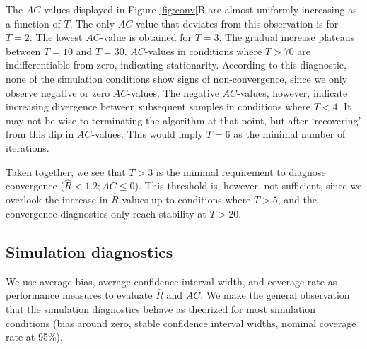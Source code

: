 \documentclass[article]{jss}
\begin{document}
The $AC$-values displayed in Figure \ref{fig:conv}B are almost uniformly increasing as a function of $T$. The only $AC$-value that deviates from this observation is for $T=2$. The lowest $AC$-value is obtained for $T=3$. %
The gradual increase plateaus between $T=10$ and $T=30$. $AC$-values in conditions where $T>70$ are indifferentiable from zero, indicating stationarity. %
According to this diagnostic, none of the simulation conditions show signs of non-convergence, since we only observe negative or zero $AC$-values. The negative $AC$-values, however, indicate increasing divergence between subsequent samples in conditions where $T<4$. It may not be wise to terminating the algorithm at that point, but after `recovering' from this dip in $AC$-values. This would imply $T=6$ as the minimal number of iterations. 


Taken together, we see that $T>3$ is the minimal requirement to diagnose convergence ($\widehat{R} < 1.2; AC \leq 0$). This threshold is, however, not sufficient, since we overlook the increase in $\widehat{R}$-values up-to conditions where $T>5$, and the convergence diagnostics only reach stability at $T>20$. %

\subsection{Simulation diagnostics}
We use average bias, average confidence interval width, and coverage rate as performance measures to evaluate $\widehat{R}$ and $AC$. We make the general observation that the simulation diagnostics behave as theorized for most simulation conditions (bias around zero, stable confidence interval widths, nominal coverage rate at 95\%). 
\end{document}
